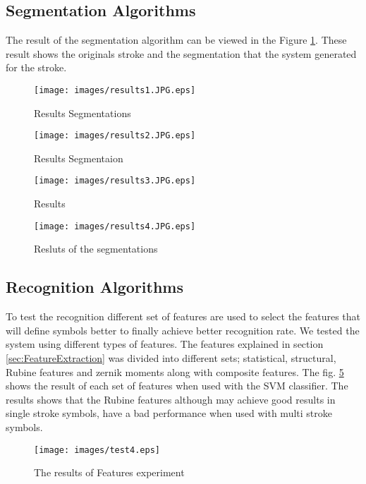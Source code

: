 \subsection{Segmentation Algorithms}
\label{sec:SegmentationAlgorithms}
The result of the segmentation algorithm can be viewed in the Figure \ref{fig:results1.JPG}. These result shows the originals stroke and the segmentation that the system generated for the stroke. 
\begin{figure}
	\centering
		\texttt{[image: images/results1.JPG.eps]}
	\caption{Results Segmentations}
	\label{fig:results1.JPG}
\end{figure}
\begin{figure}
	\centering
		\texttt{[image: images/results2.JPG.eps]}
	\caption{Results Segmentaion }
	\label{fig:results2.JPG}
\end{figure}
\begin{figure}
	\centering
		\texttt{[image: images/results3.JPG.eps]}
	\caption{Results }
	\label{fig:results3.JPG}
\end{figure}
\begin{figure}
	\centering
		\texttt{[image: images/results4.JPG.eps]}
	\caption{Resluts of the segmentations}
	\label{fig:results4.JPG}
\end{figure}



\subsection {Recognition Algorithms}
\label{sec:RecognitionAlgorithms}%
To test the recognition different set of features are used to select the features that will define symbols better to finally achieve better recognition rate. We tested the system using different types of features. The features explained in section \ref{sec:FeatureExtraction} was divided into different sets; statistical, structural, Rubine features and zernik moments along with composite features. The fig. \ref{fig:testFeatures} shows the result of each set of features when used with the SVM classifier. The results shows that the Rubine features although may achieve good results in single stroke symbols, have a bad performance when used with multi stroke symbols. 
\begin{figure}[]
	\centering
		\texttt{[image: images/test4.eps]}
	\caption{The results of Features experiment}
	\label{fig:testFeatures}
\end{figure}



